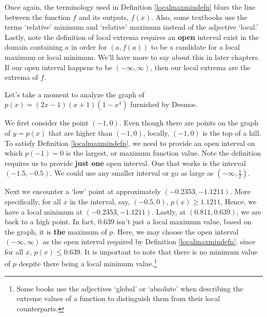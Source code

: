 \documentclass{ximera}
\begin{document}


Once again, the terminology used in Definition \ref{localmaxmindefn}  blurs the line between the function $f$ and its outputs, $f(x)$.  Also, some textbooks use the terms `relative' minimum and `relative' maximum instead of the adjective `local.'  Lastly, note  the definition of local extrema requires an \textbf{open} interval exist in the domain containing $a$ in order for $(a, f(a))$ to be a candidate for a local maximum or local minimum. We'll have more to say about this in later chapters.  If our open interval happens to be $(-\infty, \infty)$, then our local extrema are the extrema of $f$.  


Let's take a moment to analyze the graph of $p(x) = (2x-1)(x+1)(1-x^4)$ furnished by Desmos.  

\begin{center}
\end{center}

We first consider the point $(-1,0)$.   Even though there are points on the graph of $y = p(x)$ that are higher than $(-1,0)$,  locally, $(-1,0)$ is the top of a hill.  To satisfy Definition \ref{localmaxmindefn}, we need to provide an open interval on which $p(-1) = 0$ is the largest, or maximum function value. Note the definition requires us to provide \textbf{just one} open interval.  One that works is the interval $(-1.5, -0.5)$.   We could use any smaller interval or go as large as $\left(-\infty, \frac{1}{2} \right)$. 


Next we encounter  a `low' point at approximately $(-0.2353, -1.1211)$. More specifically, for all $x$ in the interval, say,  $(-0.5, 0)$, $p(x) \geq 1.1211$,  Hence, we have a local minimum at $(-0.2353, -1.1211)$.   Lastly, at $(0.811, 0.639)$, we are back to a high point.  In fact, $0.639$ isn't just a local maximum value, based on the graph, it is \textbf{the} maximum of $p$.  Here, we may choose the open interval $(-\infty, \infty)$ as the open interval required by Definition \ref{localmaxmindefn}, since for all $x$, $p(x) \leq 0.639$.   It is important to note that there is no minimum value of $p$ despite there being a local minimum value.\footnote{Some books use the adjectives `global' or `absolute' when describing the extreme values of a function to distinguish them from their local counterparts.} 
\end{document}
